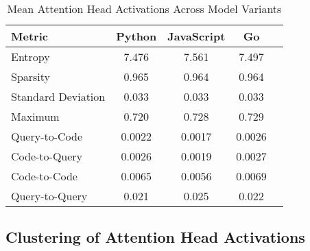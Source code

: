 \documentclass[conference]{IEEEtran}
\begin{document}
\begin{table}[h]
\centering
\caption{Mean Attention Head Activations Across Model Variants}
\label{tab:attention_activations}
\begin{tabular}{|l|c|c|c|c|}
\hline
\textbf{Metric} & \textbf{Python} & \textbf{JavaScript} & \textbf{Go} \\
\hline
Entropy & 7.476 & 7.561 & 7.497 \\
\hline
Sparsity & 0.965 & 0.964 & 0.964 \\
\hline
Standard Deviation & 0.033 & 0.033 & 0.033 \\
\hline
Maximum & 0.720 & 0.728 & 0.729 \\
\hline
Query-to-Code & 0.0022 & 0.0017 & 0.0026 \\
\hline
Code-to-Query & 0.0026 & 0.0019 & 0.0027 \\
\hline
Code-to-Code & 0.0065 & 0.0056 & 0.0069 \\
\hline
Query-to-Query & 0.021 & 0.025 & 0.022 \\
\hline
\end{tabular}
\end{table}

\subsection{Clustering of Attention Head Activations}
\end{document}
